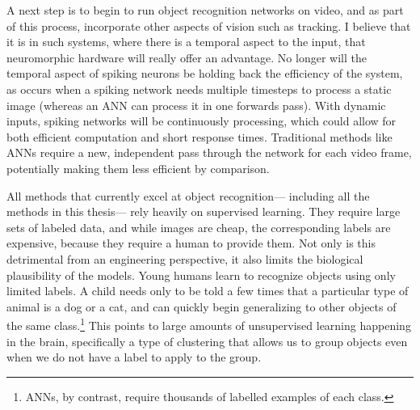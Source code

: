 A next step is to begin to run object recognition networks on video,
and as part of this process,
incorporate other aspects of vision such as tracking.
I believe that it is in such systems,
where there is a temporal aspect to the input,
that neuromorphic hardware will really offer an advantage.
No longer will the temporal aspect of spiking neurons
be holding back the efficiency of the system,
as occurs when a spiking network needs
multiple timesteps to process a static image
(whereas an ANN can process it in one forwards pass).
With dynamic inputs, spiking networks will be continuously processing,
which could allow for both efficient computation and short response times.
Traditional methods like ANNs require a new,
independent pass through the network for each video frame,
potentially making them less efficient by comparison.

All methods that currently excel at object recognition---%
including all the methods in this thesis---%
rely heavily on supervised learning.
They require large sets of labeled data,
and while images are cheap, the corresponding labels are expensive,
because they require a human to provide them.
Not only is this detrimental from an engineering perspective,
it also limits the biological plausibility of the models.
Young humans learn to recognize objects using only limited labels.
A child needs only to be told a few times that a particular type of animal
is a dog or a cat,
and can quickly begin generalizing to other objects of the same class.\footnote{
  ANNs, by contrast, require thousands of labelled examples of each class.}
This points to large amounts of unsupervised learning happening in the brain,
specifically a type of clustering that allows us to group objects
even when we do not have a label to apply to the group.

